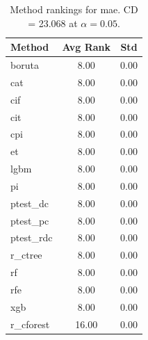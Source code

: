 \begin{table}[h]
\centering
\caption{Method rankings for mae. CD = 23.068 at $\alpha=0.05$.}
\label{tab:ranks_mae}
\begin{tabular}{lcc}
\toprule
Method & Avg Rank & Std \\
\midrule
boruta & 8.00 & 0.00 \\
cat & 8.00 & 0.00 \\
cif & 8.00 & 0.00 \\
cit & 8.00 & 0.00 \\
cpi & 8.00 & 0.00 \\
et & 8.00 & 0.00 \\
lgbm & 8.00 & 0.00 \\
pi & 8.00 & 0.00 \\
ptest_dc & 8.00 & 0.00 \\
ptest_pc & 8.00 & 0.00 \\
ptest_rdc & 8.00 & 0.00 \\
r_ctree & 8.00 & 0.00 \\
rf & 8.00 & 0.00 \\
rfe & 8.00 & 0.00 \\
xgb & 8.00 & 0.00 \\
r_cforest & 16.00 & 0.00 \\
\bottomrule
\end{tabular}
\end{table}